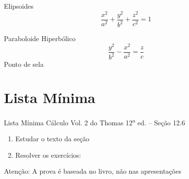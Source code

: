 \begin{frame}{Elipsoides}
  \[
    \frac{x^2}{a^2} +
    \frac{y^2}{b^2} +
    \frac{z^2}{c^2} = 1
  \]
\end{frame}

\begin{frame}{Paraboloide Hiperbólico}
  \[
    \frac{y^2}{b^2} -
    \frac{x^2}{a^2} =
    \frac{z}{c}
  \]
  Ponto de sela
\end{frame}


\section{Lista Mínima}

\begin{frame}{Lista Mínima}
  Cálculo Vol. 2 do Thomas 12\textsuperscript{a} ed. -- Seção 12.6
  \begin{enumerate}
    \item Estudar o texto da seção
    \item Resolver os exercícios:
  \end{enumerate}

  \vfill
  Atenção: A prova é baseada no livro, não nas apresentações
\end{frame}



